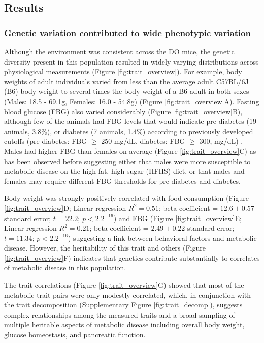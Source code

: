 \documentclass[
]{article}
\begin{document}
\subsection{Results}\label{results}

\subsubsection{Genetic variation contributed to wide phenotypic
variation}\label{genetic-variation-contributed-to-wide-phenotypic-variation}

Although the environment was consistent across the DO mice, the genetic
diversity present in this population resulted in widely varying
distributions across physiological measurements (Figure
\ref{fig:trait_overview}). For example, body weights of adult
individuals varied from less than the average adult C57BL/6J (B6) body
weight to several times the body weight of a B6 adult in both sexes
(Males: 18.5 - 69.1g, Females: 16.0 - 54.8g) (Figure
\ref{fig:trait_overview}A). Fasting blood glucose (FBG) also varied
considerably (Figure \ref{fig:trait_overview}B), although few of the
animals had FBG levels that would indicate pre-diabetes (19 animals,
3.8\%), or diabetes (7 animals, 1.4\%) according to previously developed
cutoffs (pre-diabetes: FBG \(\geq\) 250 mg/dL, diabetes: FBG \(\geq\)
300, mg/dL) \cite{pmid17018838}. Males had higher FBG than females on
average (Figure \ref{fig:trait_overview}C) as has been observed before
suggesting either that males were more susceptible to metabolic disease
on the high-fat, high-sugar (HFHS) diet, or that males and females may
require different FBG thresholds for pre-diabetes and diabetes.

Body weight was strongly positively correlated with food consumption
(Figure \ref{fig:trait_overview}D; Linear regression \(R^2 = 0.51\);
beta coefficient = \(12.6\pm0.57\) standard error; \(t = 22.2\);
\(p < 2.2^{-16}\)) and FBG (Figure \ref{fig:trait_overview}E; Linear
regression \(R^2 = 0.21\); beta coefficient = \(2.49\pm 0.22\) standard
error; \(t = 11.34\); \(p < 2.2^{-16}\)) suggesting a link between
behavioral factors and metabolic disease. However, the heritability of
this trait and others (Figure \ref{fig:trait_overview}F) indicates that
genetics contribute substantially to correlates of metabolic disease in
this population.

The trait correlations (Figure \ref{fig:trait_overview}G) showed that
most of the metabolic trait pairs were only modestly correlated, which,
in conjunction with the trait decomposition (Supplementary Figure
\ref{fig:trait_decomp}), suggests complex relationships among the
measured traits and a broad sampling of multiple heritable aspects of
metabolic disease including overall body weight, glucose homeostasis,
and pancreatic function.
\end{document}

